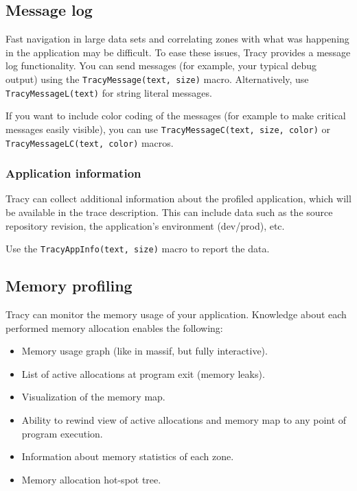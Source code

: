 \documentclass[hidelinks,titlepage,a4paper,twoside]{article}
\begin{document}
\subsection{Message log}
\label{messagelog}

Fast navigation in large data sets and correlating zones with what was happening in the application may be difficult. To ease these issues, Tracy provides a message log functionality. You can send messages (for example, your typical debug output) using the \texttt{TracyMessage(text, size)} macro. Alternatively, use \texttt{TracyMessageL(text)} for string literal messages.

If you want to include color coding of the messages (for example to make critical messages easily visible), you can use \texttt{TracyMessageC(text, size, color)} or \texttt{TracyMessageLC(text, color)} macros.

\subsubsection{Application information}
\label{appinfo}

Tracy can collect additional information about the profiled application, which will be available in the trace description. This can include data such as the source repository revision, the application's environment (dev/prod), etc.

Use the \texttt{TracyAppInfo(text, size)} macro to report the data.

\subsection{Memory profiling}
\label{memoryprofiling}

Tracy can monitor the memory usage of your application. Knowledge about each performed memory allocation enables the following:

\begin{itemize}
\item Memory usage graph (like in massif, but fully interactive).
\item List of active allocations at program exit (memory leaks).
\item Visualization of the memory map.
\item Ability to rewind view of active allocations and memory map to any point of program execution.
\item Information about memory statistics of each zone.
\item Memory allocation hot-spot tree.
\end{itemize}
\end{document}
